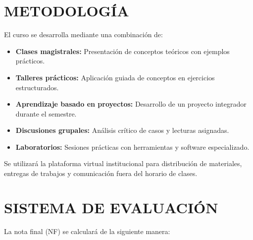\documentclass[12pt,a4paper]{article}
\begin{document}
\section{METODOLOGÍA}
\begin{tcolorbox}[colback=pucpGris!5,colframe=pucpGris,title=\textbf{Enfoque Metodológico}]
El curso se desarrolla mediante una combinación de:

\begin{itemize}[leftmargin=*]
    \item \textbf{Clases magistrales:} Presentación de conceptos teóricos con ejemplos prácticos.
    \item \textbf{Talleres prácticos:} Aplicación guiada de conceptos en ejercicios estructurados.
    \item \textbf{Aprendizaje basado en proyectos:} Desarrollo de un proyecto integrador durante el semestre.
    \item \textbf{Discusiones grupales:} Análisis crítico de casos y lecturas asignadas.
    \item \textbf{Laboratorios:} Sesiones prácticas con herramientas y software especializado.
\end{itemize}

\begin{center}
\end{center}

Se utilizará la plataforma virtual institucional para distribución de materiales, entregas de trabajos y comunicación fuera del horario de clases.
\end{tcolorbox}
\vspace{0.5cm}

\section{SISTEMA DE EVALUACIÓN}

La nota final (NF) se calculará de la siguiente manera:
\end{document}
